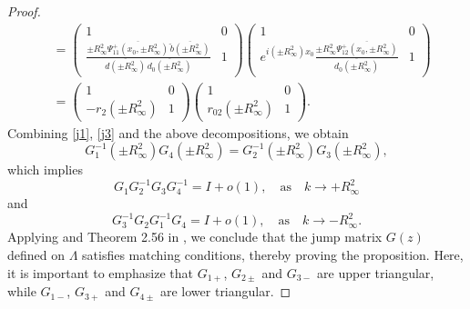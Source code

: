 \documentclass[preprint,compress,12pt]{elsarticle}
\numberwithin{equation}{section}
\begin{document}
\begin{proof}
\begin{equation*}
\begin{aligned}
&=\begin{pmatrix}1&0\\ \frac{\pm R_{\infty}^{2}\overline{\Psi_{11}^{+}(x_{0},\pm R_{\infty}^{2})}\,\overline{\breve{b}(\pm R_{\infty}^{2})}}{\overline{d(\pm R_{\infty}^{2})}\,\overline{d_{0}(\pm R_{\infty}^{2})}}&1\end{pmatrix}\begin{pmatrix}1&0\\ e^{i(\pm R_{\infty}^{2})x_{0}} \frac{\pm R_{\infty}^{2}\overline{\Psi_{12}^{+}(x_{0},\pm R_{\infty}^{2})}}{\overline{d_{0}(\pm R_{\infty}^{2})}}&1\end{pmatrix}\\
&=\begin{pmatrix}1&0\\-r_{2}(\pm R_{\infty}^{2})&1\end{pmatrix}\begin{pmatrix}1&0\\r_{02}(\pm R_{\infty}^{2})&1\end{pmatrix}.
\end{aligned}
\end{equation*}
Combining \eqref{j1}, \eqref{j3} and the above decompositions, we obtain
\begin{equation*}
G_{1}^{-1}(\pm R_{\infty}^{2})G_{4}(\pm R_{\infty}^{2})=G_{2}^{-1}(\pm R_{\infty}^{2})G_{3}(\pm R_{\infty}^{2}),
\end{equation*}
which implies
\begin{equation*}
G_{1}G_{2}^{-1}G_{3}G_{4}^{-1}=I+o(1), \quad \text{as} \quad k\rightarrow +R_{\infty}^{2}
\end{equation*}
and
\begin{equation*}
G_{3}^{-1}G_{2}G_{1}^{-1}G_{4}=I+o(1), \quad \text{as} \quad k\rightarrow -R_{\infty}^{2}.
\end{equation*}
Applying \cite{Zhou1999} and Theorem 2.56 in \cite{Trogdon}, we conclude that the jump matrix $G(z)$ defined on $\Lambda$ satisfies matching conditions, thereby proving the proposition. Here, it is important to emphasize that $G_{1+}$, $G_{2\pm}$ and $G_{3-}$ are upper triangular, while $G_{1-}$, $G_{3+}$ and $G_{4\pm}$ are lower triangular.
\end{proof}
\end{document}
